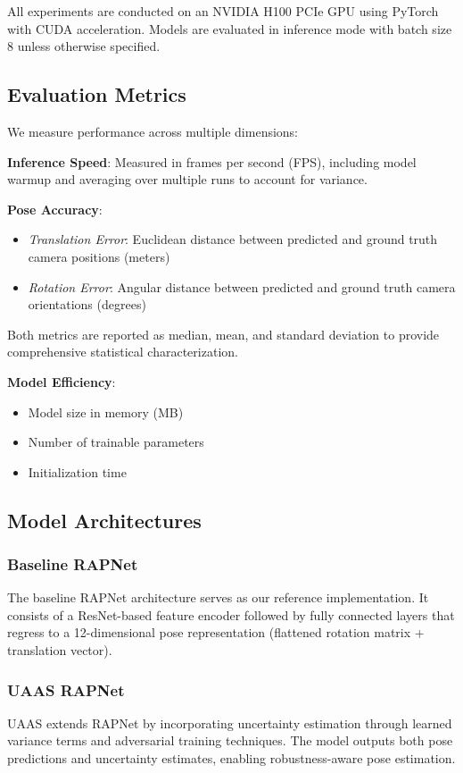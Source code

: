 \documentclass[conference]{IEEEtran}
\begin{document}
All experiments are conducted on an NVIDIA H100 PCIe GPU using PyTorch with CUDA acceleration. Models are evaluated in inference mode with batch size 8 unless otherwise specified.

\subsection{Evaluation Metrics}

We measure performance across multiple dimensions:

\textbf{Inference Speed}: Measured in frames per second (FPS), including model warmup and averaging over multiple runs to account for variance.

\textbf{Pose Accuracy}: 
\begin{itemize}
    \item \textit{Translation Error}: Euclidean distance between predicted and ground truth camera positions (meters)
    \item \textit{Rotation Error}: Angular distance between predicted and ground truth camera orientations (degrees)
\end{itemize}

Both metrics are reported as median, mean, and standard deviation to provide comprehensive statistical characterization.

\textbf{Model Efficiency}: 
\begin{itemize}
    \item Model size in memory (MB)
    \item Number of trainable parameters
    \item Initialization time
\end{itemize}

\subsection{Model Architectures}

\subsubsection{Baseline RAPNet}
The baseline RAPNet architecture serves as our reference implementation. It consists of a ResNet-based feature encoder followed by fully connected layers that regress to a 12-dimensional pose representation (flattened rotation matrix + translation vector).

\subsubsection{UAAS RAPNet}
UAAS extends RAPNet by incorporating uncertainty estimation through learned variance terms and adversarial training techniques. The model outputs both pose predictions and uncertainty estimates, enabling robustness-aware pose estimation.
\end{document}
